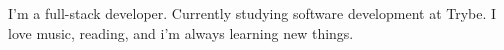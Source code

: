 

\begin{cvparagraph}


I'm a full-stack developer. Currently studying software development at Trybe. I love music, reading, and i'm always learning new things. 
\end{cvparagraph}
